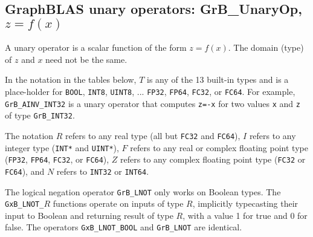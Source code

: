 \documentclass[12pt]{article}
\begin{document}
\newpage
\subsection{GraphBLAS unary operators: {\sf GrB\_UnaryOp}, $z=f(x)$} %
\label{unaryop}

A unary operator is a scalar function of the form $z=f(x)$.  The domain (type)
of $z$ and $x$ need not be the same.

In the notation in the tables
below, $T$ is any of the 13 built-in types and is a place-holder for
\verb'BOOL', \verb'INT8', \verb'UINT8', ... 
\verb'FP32', \verb'FP64', \verb'FC32', or \verb'FC64'.
For example, \verb'GrB_AINV_INT32' is a unary operator that computes
\verb'z=-x' for two values \verb'x' and \verb'z' of type \verb'GrB_INT32'.

The notation $R$ refers to any real type (all but \verb'FC32' and \verb'FC64'),
$I$ refers to any integer type (\verb'INT*' and \verb'UINT*'),
$F$ refers to any real or complex floating point type
(\verb'FP32', \verb'FP64', \verb'FC32', or \verb'FC64'),
$Z$ refers to any complex floating point type
(\verb'FC32' or \verb'FC64'),
and $N$ refers to \verb'INT32' or \verb'INT64'.

The logical negation operator \verb'GrB_LNOT' only works on Boolean types.  The
\verb'GxB_LNOT_'$R$ functions operate on inputs of type $R$, implicitly
typecasting their input to Boolean and returning result of type $R$, with a
value 1 for true and 0 for false.  The operators \verb'GxB_LNOT_BOOL' and
\verb'GrB_LNOT' are identical.
\end{document}
